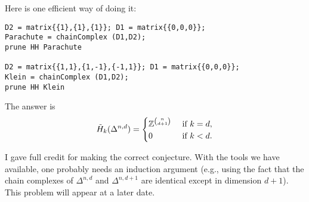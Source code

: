 
Here is one efficient way of doing it:

\begin{verbatim}
D2 = matrix{{1},{1},{1}}; D1 = matrix{{0,0,0}};
Parachute = chainComplex (D1,D2);
prune HH Parachute

D2 = matrix{{1,1},{1,-1},{-1,1}}; D1 = matrix{{0,0,0}};
Klein = chainComplex (D1,D2);
prune HH Klein
\end{verbatim}


The answer is
\[\tilde H_k(\Delta^{n,d}) = \begin{cases}
\mathbb{Z}^{\binom{n}{d+1}}  & \text{ if $k=d$},\\
0 & \text{ if $k<d$}.
\end{cases}\]

I gave full credit for making the correct conjecture.  With the tools we have available, one probably needs an induction argument (e.g., using the fact that the chain complexes of $\Delta^{n,d}$ and $\Delta^{n,d+1}$ are identical except in dimension $d+1$).  This problem will appear at a later date.




